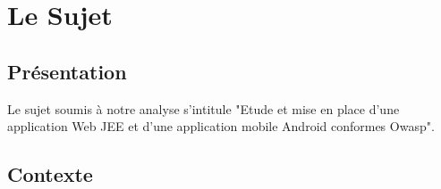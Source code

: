 \chapter{Le Sujet}

\section{Présentation}

Le sujet soumis à notre analyse s'intitule "Etude et mise en place d'une application Web JEE et d'une application mobile Android conformes Owasp". 

\section{Contexte}

